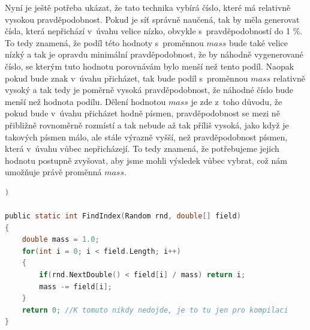 \documentclass[a4paper]{article}
\begin{document}
Nyní je ještě potřeba ukázat, že tato technika vybírá číslo, které má relativně vysokou prav\-dě\-po\-dob\-nost. Pokud je síť správně naučená, tak by měla generovat čísla, která nepřichází v~úvahu velice nízko, obvykle s~pravděpodobností do 1 \%. To tedy znamená, že podíl této hodnoty s~proměnnou $mass$ bude také velice nízký a tak je opravdu minimální pravděpodobnost, že by náhodně vygenerované číslo, se kterým tuto hodnotu porovnávám bylo menší než tento podíl. Naopak pokud bude znak v~úvahu přicházet, tak bude podíl s~proměnnou $mass$ relativně vysoký a tak tedy je poměrně vysoká pravděpodobnost, že náhodné číslo bude menší než hodnota podílu. Dělení hodnotou $mass$ je zde z~toho důvodu, že pokud bude v~úvahu přicházet hodně písmen, pravděpodobnost se mezi ně přibližně rovnoměrně rozmístí a tak nebude až tak příliš vysoká, jako když je takových písmen málo, ale stále výrazně vyšší, než pravděpodobnost písmen, která v~úvahu vůbec nepřicházejí. To tedy znamená, že potřebujeme jejich hodnotu postupně zvyšovat, aby jsme mohli výsledek vůbec vybrat, což nám umožňuje právě proměnná $mass$.
\begin{lstlisting}[language=C, title={Ukázka kódu pro výběr prvku z~pole}])

public static int FindIndex(Random rnd, double[] field)
{
	double mass = 1.0;
	for(int i = 0; i < field.Length; i++)
	{
		if(rnd.NextDouble() < field[i] / mass) return i;
		mass -= field[i];
	}
	return 0; //K tomuto nikdy nedojde, je to tu jen pro kompilaci
}
\end{lstlisting}
\end{document}
